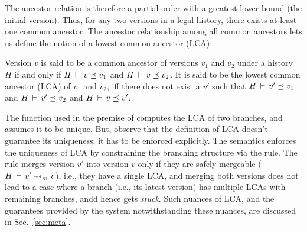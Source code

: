 The ancestor relation is therefore a partial order with a greatest
lower bound (the initial version).  Thus, for any two versions in a
legal history, there exists at least one common ancestor.  The ancestor
relationship among all common ancestors lets us define the notion of a
lowest common ancestor (LCA):

\begin{definition} 
Version $v$ is said to be a common ancestor of versions $v_1$ and
$v_2$ under a history $H$ if and only if $H\,\vdash\,v \preceq v_1$
and $H\,\vdash\,v \preceq v_2$. It is said to be the lowest common
ancestor (LCA) of $v_1$ and $v_2$, iff there does not exist a $v'$
such that $H\,\vdash\,v' \preceq v_1$ and $H\,\vdash\,v' \preceq v_2$
and $H\,\vdash\,v \preceq v'$.
\end{definition}

The function  used in the premise of 
computes the LCA of two branches, and assumes it to be unique.  But,
observe that the definition of LCA doesn't guarantee its uniqueness;
it has to be enforced explicitly.  The semantics enforces the
uniqueness of LCA by constraining the branching structure via the
 rule. The rule merges version $v'$ into
version $v$ only if they are safely mergeable ($H\,\vdash\,v' \rightsquigarrow_m
  v$), i.e., they have a single LCA, and merging both versions does
not lead to a case where a branch (i.e., its latest version) has
multiple LCAs with remaining branches, andd hence gets
\emph{stuck}. Such nuances of LCA, and the guarantees provided by the
system notwithstanding these nuances, are discussed in 
Sec.~\ref{sec:meta}.




